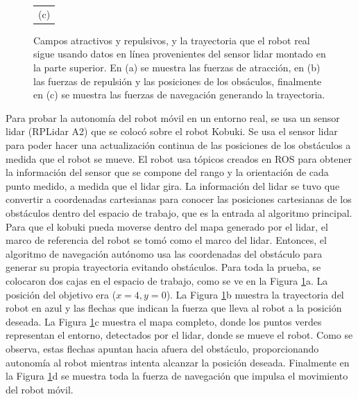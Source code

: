 \begin{figure}
\begin{tabular}{c}
      \multicolumn{1}{c}{(c)}
    \end{tabular}
  \captionsetup{font=footnotesize}
    \caption{\label{f:kbki_autonomo}Campos atractivos y repulsivos, y la trayectoria que el 
    robot real sigue usando datos en línea provenientes del sensor lidar montado en la parte 
    superior. En (a) se muestra las fuerzas de atracción, en (b) las fuerzas de repulsión y 
    las posiciones de los obsáculos, finalmente en (c) se muestra las fuerzas de navegación 
    generando la trayectoria.}
\end{figure}


Para probar la autonomía del robot móvil en un entorno real, se usa un sensor lidar 
(RPLidar A2) que se colocó sobre el robot Kobuki. Se usa el sensor lidar para poder 
hacer una actualización continua de las posiciones de los obstáculos a medida que el 
robot se mueve. El robot usa tópicos creados en ROS para obtener la información del 
sensor que se compone del rango y la orientación de cada punto medido, a medida que 
el lidar gira. La información del lidar se tuvo que convertir a coordenadas cartesianas 
para conocer las posiciones cartesianas de los obstáculos dentro del espacio de trabajo, 
que es la entrada al algoritmo principal. Para que el kobuki pueda moverse dentro del 
mapa generado por el lidar, el marco de referencia del robot se tomó como el marco del 
lidar. Entonces, el algoritmo de navegación autónomo usa las coordenadas del obstáculo 
para generar su propia trayectoria evitando obstáculos. Para toda la prueba, se colocaron 
dos cajas en el espacio de trabajo, como se ve en la Figura \ref{f:kbki_autonomo}a. La 
posición del objetivo era ($x = 4, y = 0$). La Figura \ref{f:kbki_autonomo}b muestra 
la trayectoria del robot en azul y las flechas que indican la fuerza que lleva al robot a la 
posición deseada. La Figura \ref{f:kbki_autonomo}c muestra el mapa completo, donde los 
puntos verdes representan el entorno, detectados por el lidar, donde se mueve el robot. Como 
se observa, estas flechas apuntan hacia afuera del obstáculo, proporcionando autonomía al 
robot mientras intenta alcanzar la posición deseada. Finalmente en la Figura 
\ref{f:kbki_autonomo}d se muestra toda la fuerza de navegación que impulsa el movimiento 
del robot móvil.

